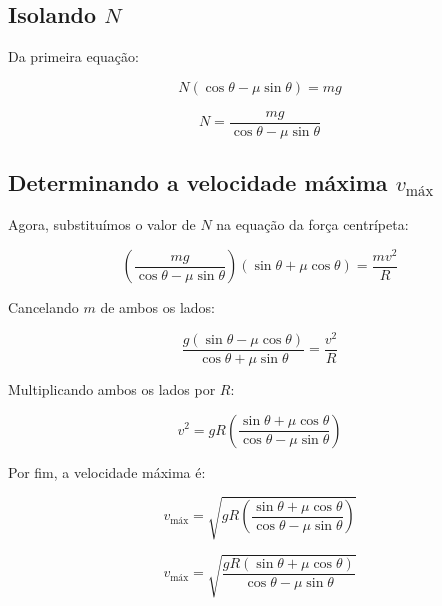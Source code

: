 \documentclass[a4paper,12pt]{article}
\begin{document}
\begin{flushleft}
\subsection*{Isolando \( N \)}

Da primeira equação:

\begin{equation}
N \left( \cos\theta - \mu \sin\theta \right) = mg
\end{equation}

\begin{equation}
N = \frac{mg}{\cos\theta - \mu \sin\theta}
\label{eq:N}
\end{equation}

\subsection*{Determinando a velocidade máxima \( v_{\text{máx}} \)}

Agora, substituímos o valor de \( N \) na equação da força centrípeta:

\begin{equation}
\left( \frac{mg}{\cos\theta - \mu \sin\theta} \right) \left( \sin\theta + \mu \cos\theta \right) = \frac{mv^2}{R}
\end{equation}

Cancelando \( m \) de ambos os lados:

\begin{equation}
\frac{g \left( \sin\theta - \mu \cos\theta \right)}{\cos\theta + \mu \sin\theta} = \frac{v^2}{R}
\end{equation}

Multiplicando ambos os lados por \( R \):

\begin{equation}
v^2 = gR \left( \frac{ \sin\theta + \mu \cos\theta }{ \cos\theta - \mu \sin\theta } \right)
\end{equation}

Por fim, a velocidade máxima é:

\begin{equation}
v_{\text{máx}} = \sqrt{ gR \left( \frac{ \sin\theta + \mu \cos\theta }{ \cos\theta - \mu \sin\theta } \right) }
\end{equation}

\begin{equation}
\boxed{
v_{\text{máx}} = \sqrt{ \frac{gR\left( \sin\theta + \mu \cos\theta \right)}{ \cos\theta - \mu \sin\theta } }
}
\end{equation}


\end{flushleft}
\end{document}
